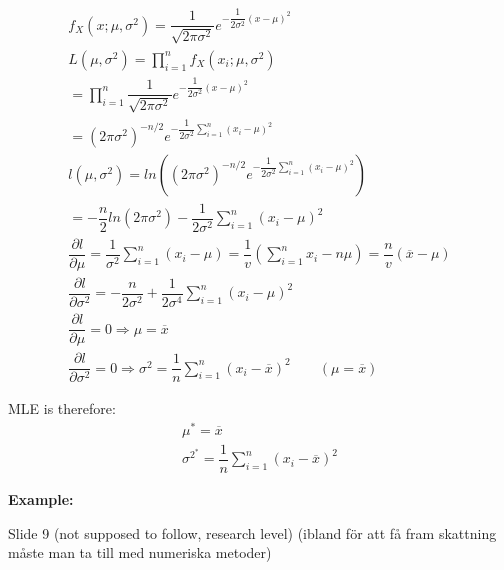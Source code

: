 \begin{equation*}
  \begin{gathered}
    f_X(x;\mu,\sigma^2) = \dfrac{1}{\sqrt{2\pi\sigma^2}}e^{-\dfrac{1}{2\sigma^2}(x-\mu)^2}\\
    L(\mu,\sigma^2) = \prod_{i=1}^n f_X(x_i;\mu,\sigma^2)\\
    = \prod_{i=1}^n\dfrac{1}{\sqrt{2\pi\sigma^2}}e^{-\dfrac{1}{2\sigma^2}(x-\mu)^2}\\
    = (2\pi\sigma^2)^{-n/2}e^{-\dfrac{1}{2\sigma^2}\sum_{i=1}^{n}(x_i-\mu)^2}\\
    l(\mu,\sigma^2) = ln\left((2\pi\sigma^2)^{-n/2}e^{-\dfrac{1}{2\sigma^2}\sum_{i=1}^{n}(x_i-\mu)^2}\right)\\
    = -\dfrac{n}{2}ln(2\pi\sigma^2)-\dfrac{1}{2\sigma^2}\sum_{i=1}^{n}(x_i-\mu)^2\\
    \dfrac{\partial l}{\partial \mu} = \dfrac{1}{\sigma^2}\sum_{i=1}^{n}(x_i-\mu) = \dfrac{1}{v}\left(\sum_{i=1}^{n}x_i-n\mu\right) = \dfrac{n}{v}\left(\overline{x}-\mu\right)\\
    \dfrac{\partial l}{\partial\sigma^2} = -\dfrac{n}{2\sigma^2} + \dfrac{1}{2\sigma^4}\sum_{i=1}^{n}(x_i-\mu)^2\\
    \dfrac{\partial l}{\partial \mu} = 0\Rightarrow \mu = \overline{x}\\
    \dfrac{\partial l}{\partial \sigma^2} = 0\Rightarrow \sigma^2 = \dfrac{1}{n}\sum_{i=1}^{n}(x_i-\overline{x})^2\qquad (\mu = \overline{x})
  \end{gathered}
\end{equation*}
\par\bigskip
\noindent MLE is therefore:
\begin{equation*}
  \begin{gathered}
    \mu^* = \overline{x}\\
    \sigma^{2^*} = \dfrac{1}{n}\sum_{i=1}^{n}(x_i-\overline{x})^2
  \end{gathered}
\end{equation*}
\par\bigskip
\noindent\textbf{Example:}\par
Slide 9 (not supposed to follow, research level) (ibland för att få fram skattning måste man ta till med numeriska metoder)

